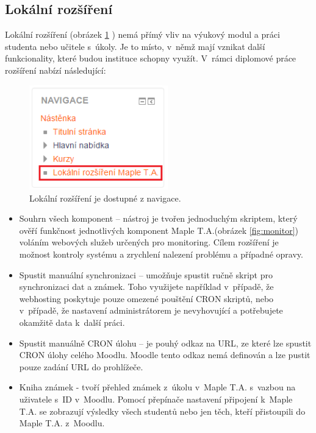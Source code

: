 \documentclass[
print,
  11pt,
  table,   
  nolof,    
  nolot,
  oneside,final
]{fithesis3}
\begin{document}
		\subsection{Lokální rozšíření}
Lokální rozšíření (obrázek \ref{fig:localext} ) nemá přímý vliv na výukový modul a práci studenta nebo učitele s~úkoly. Je to místo, v~němž mají vznikat další funkcionality, které budou instituce schopny využít. V~rámci diplomové práce rozšíření nabízí následující:
\begin{figure}[htb]
		  \begin{center}
		    \includegraphics[width=60mm]{images/localext.png}
		   \end{center}
		  \caption{Lokální rozšíření je dostupné z navigace.}
		  \label{fig:localext}
		\end{figure}
\begin{itemize}
 \item Souhrn všech komponent -- nástroj je tvořen jednoduchým skriptem, který ověří funkčnost jednotlivých komponent Maple T.A.(obrázek \ref{fig:monitor}) voláním webových služeb určených pro monitoring. Cílem rozšíření je možnost kontroly systému a zrychlení nalezení problému a případné opravy.
 \item Spustit manuální synchronizaci -- umožňuje spustit ručně skript pro synchronizaci dat a známek. Toho využijete například v~případě, že webhosting poskytuje pouze omezené pouštění CRON skriptů, nebo v~případě, že nastavení administrátorem je nevyhovující a potřebujete okamžitě data k~další práci.
 \item Spustit manuálně CRON úlohu -- je pouhý odkaz na URL, ze které lze spustit CRON úlohy celého Moodlu. Moodle tento odkaz nemá definován a lze pustit pouze zadání URL do prohlížeče.
 \item Kniha známek - tvoří přehled známek z~úkolu v~Maple T.A. s~vazbou na uživatele s~ID v~Moodlu. Pomocí přepínače nastavení připojení k~Maple T.A. se zobrazují výsledky všech studentů nebo jen těch, kteří přistoupili do Maple T.A. z~Moodlu.
\end{itemize}
\end{document}
